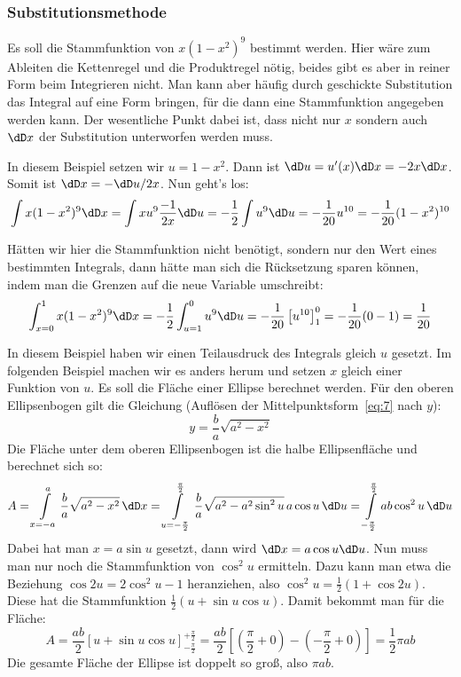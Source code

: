 \subsubsection{Substitutionsmethode}
Es soll die Stammfunktion von $x(1-x^2)^9$ bestimmt werden. Hier wäre zum
Ableiten die Kettenregel und die Produktregel nötig, beides gibt es aber in
reiner Form beim Integrieren nicht. Man kann aber häufig durch geschickte
Substitution das Integral auf eine Form bringen, für die dann eine
Stammfunktion angegeben werden kann. Der wesentliche Punkt dabei ist, dass
nicht nur $x$ sondern auch $\dD x$ der Substitution unterworfen werden muss.

In diesem Beispiel setzen wir $u=1-x^2$. Dann ist $\dD u=u'(x)\dD x=-2x\dD x$.
Somit ist $\dD x=-\dD u/2x$. Nun geht's los:
\[
\int x(1-x^2)^9\dD x=\int x u^9 \frac{-1}{2x}\dD u
=-\frac{1}{2}\int u^9\dD u=-\frac{1}{20}u^{10}=-\frac{1}{20}(1-x^2)^{10}
\]

Hätten wir hier die Stammfunktion nicht benötigt, sondern nur den Wert eines
bestimmten Integrals, dann hätte man sich die Rücksetzung sparen können, indem
man die Grenzen auf die neue Variable umschreibt:
\[
\int_{x=0}^1 x(1-x^2)^9\dD x=-\frac{1}{2}\int_{u=1}^0u^9\dD u
=-\frac{1}{20}\left[u^{10}\right]_1^0=-\frac{1}{20}(0-1)=\frac{1}{20}
\]

In diesem Beispiel haben wir einen Teilausdruck des Integrals gleich $u$
gesetzt. Im folgenden Beispiel machen wir es anders herum und setzen $x$
gleich einer Funktion von $u$. Es soll die Fläche einer Ellipse berechnet
werden. Für den oberen Ellipsenbogen gilt die Gleichung (Auflösen der
Mittelpunktsform~\eqref{eq:7} nach $y$):
\[
y=\frac{b}{a}\sqrt{a^2-x^2}
\]
Die Fläche unter dem oberen Ellipsenbogen ist die halbe Ellipsenfläche und
berechnet sich so:
\[
A=\int\limits_{x=-a}^a \frac{b}{a}\sqrt{a^2-x^2}\,\dD x=
\int\limits_{u=-\frac{\pi}{2}}^{\frac{\pi}{2}}
\frac{b}{a}\sqrt{a^2-a^2\sin^2u}\,a\cos u\,\dD u=
\int\limits_{-\frac{\pi}{2}}^{\frac{\pi}{2}}ab\cos^2u\,\dD u
\]
Dabei hat man $x=a\sin u$ gesetzt, dann wird $\dD x=a\cos u \dD u$. Nun muss
man nur noch die Stammfunktion von $\cos^2u$ ermitteln. Dazu kann man etwa die
Beziehung $\cos2u=2\cos^2u-1$ heranziehen, also
$\cos^2u=\frac{1}{2}(1+\cos2u)$. Diese hat die Stammfunktion
$\frac{1}{2}(u+\sin u\cos u)$. Damit bekommt man für die Fläche:
\[
A=\frac{ab}{2}\left[u+\sin u\cos u\right]_{-\frac{\pi}{2}}^{+\frac{\pi}{2}}=
\frac{ab}{2}[(\frac{\pi}{2}+0)-(-\frac{\pi}{2}+0)]=\frac{1}{2}\pi a b
\]
Die gesamte Fläche der Ellipse ist doppelt so groß, also $\pi a b$.

